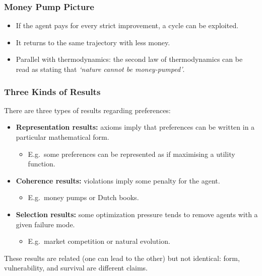 \documentclass[10pt,a4paper]{beamer}
\newcommand{\exitem}{\item[$\triangleright$]}
\begin{document}
\begin{frame}
    \frametitle{Money Pump Picture}
    \centering
    
    \vspace{0.35cm}
    \begin{itemize}
        \item If the agent pays for every strict improvement, a cycle can be exploited.
        \pause
        \item It returns to the same trajectory with less money.
        \pause
        \item Parallel with thermodynamics: the second law of thermodynamics can be read as stating that \textit{`nature cannot be money-pumped'}.
    \end{itemize}
    \end{frame}
    
    

\begin{frame}
\frametitle{Three Kinds of Results}
There are three types of results regarding preferences:
\vspace{0.4cm}
\begin{itemize}
    \item \textbf{Representation results:}
    axioms imply that preferences can be written in a particular mathematical form.
    \begin{itemize}
        \exitem E.g.\ some preferences can be represented as if maximising a utility function.
    \end{itemize}
    \pause
    \item \textbf{Coherence results:}
    violations imply some penalty for the agent.
    \begin{itemize}
        \exitem E.g.\ money pumps or Dutch books.
    \end{itemize}
    \pause
    \item \textbf{Selection results:}
    some optimization pressure tends to remove agents with a given failure mode.
    \begin{itemize}
        \exitem E.g.\ market competition or natural evolution.
    \end{itemize}
    \pause
\end{itemize}
These results are related (one can lead to the other) but not identical: form, vulnerability, and survival
    are different claims.
\end{frame}
\end{document}
